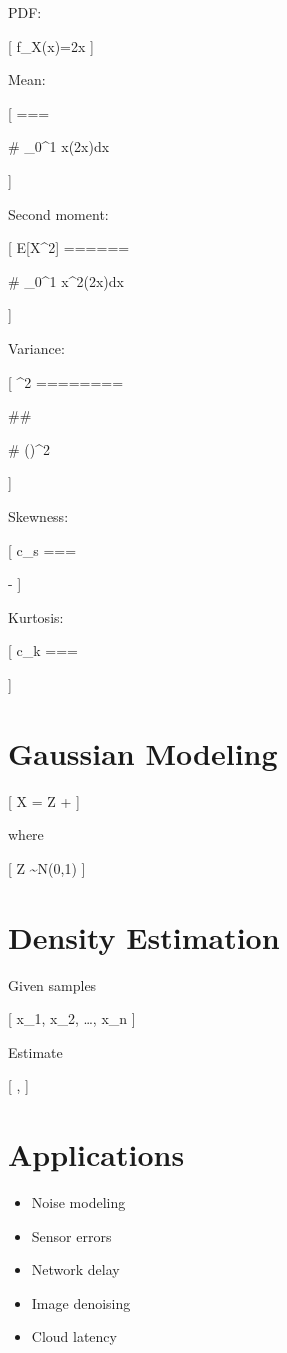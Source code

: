 \documentclass[12pt]{article}
\begin{document}
PDF:

[
f_X(x)=2x
]

Mean:

[
\mu
===

# \int_0^1 x(2x)dx

]

Second moment:

[
E[X^2]
======

# \int_0^1 x^2(2x)dx

]

Variance:

[
\sigma^2
========

## 

# \left(\right)^2

]

Skewness:

[
c_s
===

-
]

Kurtosis:

[
c_k
===

]

\section{Gaussian Modeling}

[
X = \sigma Z + \mu
]

where

[
Z \sim N(0,1)
]

\section{Density Estimation}

Given samples

[
x_1, x_2, \dots, x_n
]

Estimate

[
\hat{\mu}, \hat{\sigma}
]

\section{Applications}

\begin{itemize}
\item Noise modeling
\item Sensor errors
\item Network delay
\item Image denoising
\item Cloud latency
\end{itemize}
\end{document}
